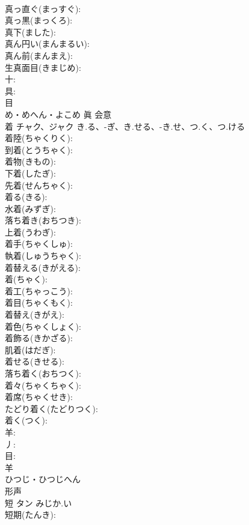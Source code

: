 \documentclass[8pt]{extreport}
\begin{document}
\begin{CJK}{UTF8}{min}
\\	真っ直ぐ(まっすぐ): 
\\	真っ黒(まっくろ): 
\\	真下(ました): 
\\	真ん円い(まんまるい): 
\\	真ん前(まんまえ): 
\\	生真面目(きまじめ): 
\\	十: 
\\	具: 
\\	目	
\\	め・めへん・よこめ	眞	会意 
\\	着	チャク、ジャク	き.る、-ぎ、き.せる、-き.せ、つ.く、つ.ける		
\\	着陸(ちゃくりく): 
\\	到着(とうちゃく): 
\\	着物(きもの): 
\\	下着(したぎ): 
\\	先着(せんちゃく): 
\\	着る(きる): 
\\	水着(みずぎ): 
\\	落ち着き(おちつき): 
\\	上着(うわぎ): 
\\	着手(ちゃくしゅ): 
\\	執着(しゅうちゃく): 
\\	着替える(きがえる): 
\\	着(ちゃく): 
\\	着工(ちゃっこう): 
\\	着目(ちゃくもく): 
\\	着替え(きがえ): 
\\	着色(ちゃくしょく): 
\\	着飾る(きかざる): 
\\	肌着(はだぎ): 
\\	着せる(きせる): 
\\	落ち着く(おちつく): 
\\	着々(ちゃくちゃく): 
\\	着席(ちゃくせき): 
\\	たどり着く(たどりつく): 
\\	着く(つく): 
\\	羊: 
\\	丿: 
\\	目: 
\\	羊	
\\	ひつじ・ひつじへん	
\\	形声 
\\	短	タン	みじか.い		
\\	短期(たんき): 

\end{CJK}
\end{document}
